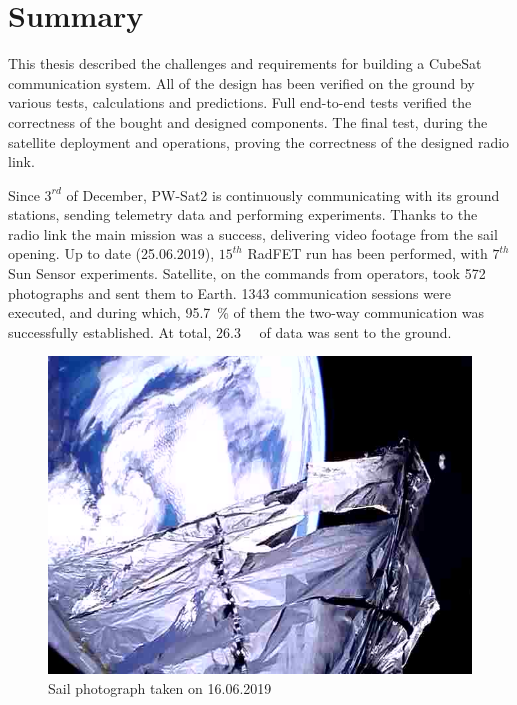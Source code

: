\section{Summary}
This thesis described the challenges and requirements for building a CubeSat communication system. All of the design has been verified on the ground by various tests, calculations and predictions. Full end-to-end tests verified the correctness of the bought and designed components. The final test, during the satellite deployment and operations, proving the correctness of the designed radio link.

Since $3^{rd}$ of December, PW-Sat2 is continuously communicating with its ground stations, sending telemetry data and performing experiments. Thanks to the radio link the main mission was a success, delivering video footage from the sail opening. Up to date (25.06.2019), $15^{th}$ RadFET run has been performed, with $7^{th}$ Sun Sensor experiments. Satellite, on the commands from operators, took \si{572} photographs and sent them to Earth. \si{1343} communication sessions were executed, and during which, \SI{95.7}{\percent} of them the two-way communication was successfully established. At total, \SI{26.3}{\mega\byte} of data was sent to the ground.

\begin{figure}[H]
    \centering
    \includegraphics[width=0.65\paperwidth]{img/9/sail_photo.jpg}
    \caption{Sail photograph taken on 16.06.2019}
    \label{sail_photo}
\end{figure}
